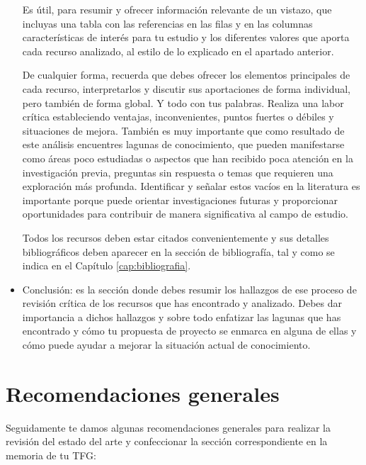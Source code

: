 \begin{itemize}
    Es útil, para resumir y ofrecer información relevante de un vistazo, que incluyas una tabla con las referencias en las filas y en las columnas características de interés para tu estudio y los diferentes valores que aporta cada recurso analizado, al estilo de lo explicado en el apartado anterior.

    De cualquier forma, recuerda que debes ofrecer los elementos principales de cada recurso, interpretarlos y discutir sus aportaciones de forma individual, pero también de forma global. Y todo con tus palabras. Realiza una labor crítica estableciendo ventajas, inconvenientes, puntos fuertes o débiles y situaciones de mejora. También es muy importante que como resultado de este análisis encuentres lagunas de conocimiento, que pueden manifestarse como áreas poco estudiadas o aspectos que han recibido poca atención en la investigación previa, preguntas sin respuesta o temas que requieren una exploración más profunda. Identificar y señalar estos vacíos en la literatura es importante porque puede orientar investigaciones futuras y proporcionar oportunidades para contribuir de manera significativa al campo de estudio.

    Todos los recursos deben estar citados convenientemente y sus detalles bibliográficos deben aparecer en la sección de bibliografía, tal y como se indica en el Capítulo \ref{cap:bibliografia}.

    \item Conclusión: es la sección donde debes resumir los hallazgos de ese proceso de revisión crítica de los recursos que has encontrado y analizado. Debes dar importancia a dichos hallazgos y sobre todo enfatizar las lagunas que has encontrado y cómo tu propuesta de proyecto se enmarca en alguna de ellas y cómo puede ayudar a mejorar la situación actual de conocimiento.
\end{itemize}

\section{Recomendaciones generales}

Seguidamente te damos algunas recomendaciones generales para realizar la revisión del estado del arte y confeccionar la sección correspondiente en la memoria de tu TFG:

